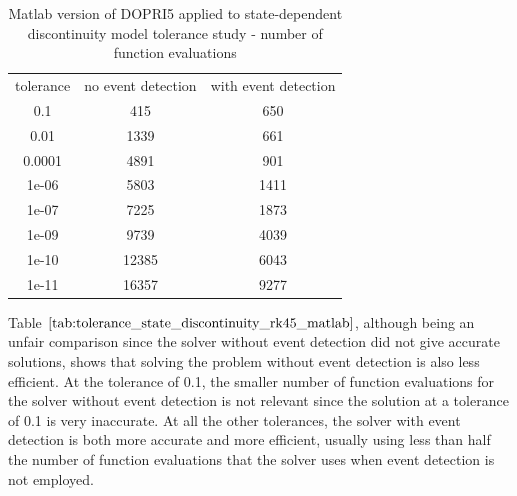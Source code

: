 \begin{table}[h]
\caption {Matlab version of DOPRI5 applied to state-dependent discontinuity model tolerance study - number of function evaluations} 
\label{tab:tolerance_state_discontinuity_rk45_matlab} 
\begin{center}
\begin{tabular}{ c c c }
tolerance & no event detection & with event detection \\
0.1 & 415 & 650 \\
0.01 & 1339 & 661 \\
0.0001 & 4891 & 901 \\
1e-06 & 5803 & 1411 \\
1e-07 & 7225 & 1873 \\
1e-09 & 9739 & 4039 \\
1e-10 & 12385 & 6043 \\
1e-11 & 16357 & 9277 \\
\end{tabular}
\end{center}
\end{table}

Table $\ref{tab:tolerance_state_discontinuity_rk45_matlab}$, although being an unfair comparison since the solver without event detection did not give accurate solutions, shows that solving the problem without event detection is also less efficient. At the tolerance of 0.1, the smaller number of function evaluations for the solver without event detection is not relevant since the solution at a tolerance of 0.1 is very inaccurate. At all the other tolerances, the solver with event detection is both more accurate and more efficient, usually using less than half the number of function evaluations
that the solver uses when event detection is not employed.

